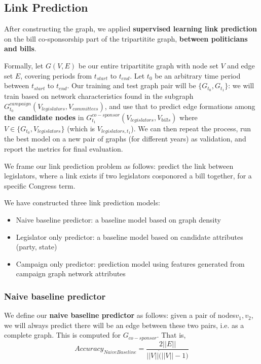 \documentclass[12pt,twocolumn]{article}
\begin{document}
\subsection{Link Prediction}
After constructing the graph, we applied \textbf{supervised learning link prediction} on the bill co-sponsorship part of the tripartitite graph, \textbf{between politicians and bills}.

Formally, let $G(V,E)$ be our entire tripartitite graph with node set $V$ and edge set $E$, covering periods from $t_{start}$ to $t_{end}$. Let $t_0$ be an arbitrary time period between  $t_{start}$ to $t_{end}$. Our training and test graph pair will be $\{G_{t_{0}}, G_{t_{1}}\}$: we will train based on network characteristics found in the subgraph $G^{campaign}_{t_{0}}(V_{legislators}, V_{committees})$, and use that to predict edge formations among \textbf{the candidate nodes} in $G^{co-sponsor}_{t_{1}}(V_{legislators},V_{bills})$ where $V \in \{G_{t_{0}}, V_{legislators}\}$ (which is $V_{legislators, t_1}$). We can then repeat the process, run the best model on a new pair of graphs (for different years) as validation, and report the metrics for final evaluation. 

We frame our link prediction problem as follows: predict the link between legislators, where a link exists if two legislators cosponored a bill together, for a specific Congress term.  

We have constructed three link prediction models:
\begin{itemize}
    \item Naive baseline predictor: a baseline model based on graph density
    \item Legislator only predictor: a baseline model based on candidate attributes (party, state)
    \item Campaign only predictor: prediction model using features generated from campaign graph network attributes
\end{itemize}

\subsubsection{Naive baseline predictor}
We define our \textbf{naive baseline predictor} as follows: given a pair of nodes$v_1, v_2$, we will always predict there will be an edge between these two pairs, i.e. as a complete graph. This is computed for $G_{co-sponsor}$.  That is, $$Accuracy_{Naive Baseline} = \frac{2||E||}{||V|| \dot (||V|| - 1)} $$
\end{document}
